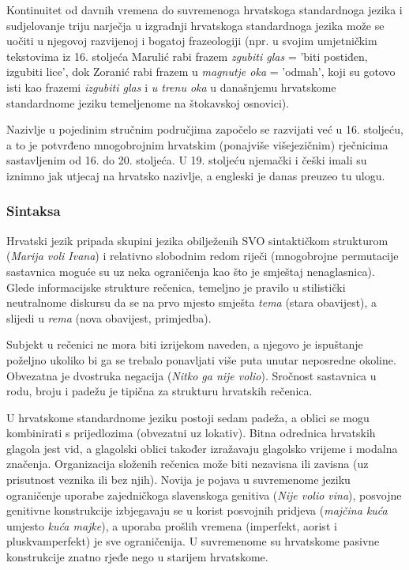 \begin{multicols}{2}
Kontinuitet od davnih vremena do suvremenoga hrvatskoga standardnoga jezika i sudjelovanje triju narječja u izgradnji hrvatskoga standardnoga jezika može se uočiti u njegovoj razvijenoj i bogatoj frazeologiji (npr. u svojim umjetničkim tekstovima iz 16. stoljeća Marulić rabi frazem \emph{zgubiti glas} = 'biti postiđen, izgubiti lice', dok Zoranić rabi frazem u \emph{magnutje oka} = 'odmah', koji su gotovo isti kao frazemi \emph{izgubiti glas} i \emph{u trenu oka} u današnjemu hrvatskome standardnome jeziku temeljenome na štokavskoj osnovici).

Nazivlje u pojedinim stručnim područjima započelo se razvijati već u 16. stoljeću, a to je potvrđeno mnogobrojnim hrvatskim (ponajviše višejezičnim) rječnicima sastavljenim od 16. do 20. stoljeća. U 19. stoljeću njemački i češki imali su iznimno jak utjecaj na hrvatsko nazivlje, a engleski je danas preuzeo tu ulogu.


\subsubsection{Sintaksa}

Hrvatski jezik pripada skupini jezika obilježenih SVO sintaktičkom strukturom (\emph{Marija voli Ivana}) i relativno slobodnim redom riječi (mnogobrojne permutacije sastavnica moguće su uz neka ograničenja kao što je smještaj nenaglasnica). Glede informacijske strukture rečenica, temeljno je pravilo u stilistički neutralnome diskursu da se na prvo mjesto smješta \emph{tema} (stara obavijest), a slijedi u \emph{rema} (nova obavijest, primjedba).

Subjekt u rečenici ne mora biti izrijekom naveden, a njegovo je ispuštanje poželjno ukoliko bi ga se trebalo ponavljati više puta unutar neposredne okoline. Obvezatna je dvostruka negacija (\emph{Nitko ga nije volio}). Sročnost sastavnica u rodu, broju i padežu je tipična za strukturu hrvatskih rečenica. 

U hrvatskome standardnome jeziku postoji sedam padeža, a oblici se mogu kombinirati s prijedlozima (obvezatni uz lokativ). Bitna odrednica hrvatskih glagola jest vid, a glagolski oblici također izražavaju glagolsko vrijeme i modalna značenja. Organizacija složenih rečenica može biti nezavisna ili zavisna (uz prisutnost veznika ili bez njih). Novija je pojava u suvremenome jeziku ograničenje uporabe zajedničkoga slavenskoga genitiva (\emph{Nije volio vina}), posvojne genitivne konstrukcije izbjegavaju se u korist posvojnih pridjeva (\emph{majčina kuća} umjesto \emph{kuća majke}), a uporaba prošlih vremena (imperfekt, aorist i pluskvamperfekt) je sve ograničenija. U suvremenome su hrvatskome pasivne konstrukcije znatno rjeđe nego u starijem hrvatskome.


\end{multicols}
